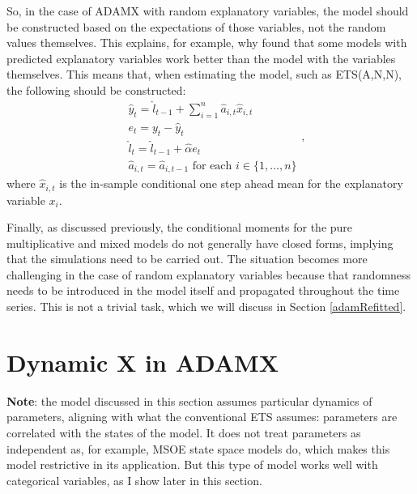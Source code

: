 \documentclass[
]{book}
\theoremstyle{definition}
\theoremstyle{definition}
\theoremstyle{definition}
\theoremstyle{definition}
\theoremstyle{remark}
\begin{document}
So, in the case of ADAMX with random explanatory variables, the model should be constructed based on the expectations of those variables, not the random values themselves. This explains, for example, why \citet{Athanasopoulos2011} found that some models with predicted explanatory variables work better than the model with the variables themselves. This means that, when estimating the model, such as ETS(A,N,N), the following should be constructed:
\begin{equation}
  \begin{aligned}
    & \hat{y}_{t} = \hat{l}_{t-1} + \sum_{i=1}^n \hat{a}_{i,t} \hat{x}_{i,t} \\
    & e_t = y_t -\hat{y}_{t} \\
    & \hat{l}_{t} = \hat{l}_{t-1} + \hat{\alpha} e_t \\
    & \hat{a}_{i,t} = \hat{a}_{i,t-1} \text{ for each } i \in \{1, \dots, n\}
  \end{aligned},
  \label{eq:ADAMETSXANNConstructed}
\end{equation}
where \(\hat{x}_{i,t}\) is the in-sample conditional one step ahead mean for the explanatory variable \(x_i\).

Finally, as discussed previously, the conditional moments for the pure multiplicative and mixed models do not generally have closed forms, implying that the simulations need to be carried out. The situation becomes more challenging in the case of random explanatory variables because that randomness needs to be introduced in the model itself and propagated throughout the time series. This is not a trivial task, which we will discuss in Section \ref{adamRefitted}.

\hypertarget{ADAMXDynamic}{%
\section{Dynamic X in ADAMX}\label{ADAMXDynamic}}

\textbf{Note}: the model discussed in this section assumes particular dynamics of parameters, aligning with what the conventional ETS assumes: parameters are correlated with the states of the model. It does not treat parameters as independent as, for example, MSOE state space models do, which makes this model restrictive in its application. But this type of model works well with categorical variables, as I show later in this section.
\end{document}
